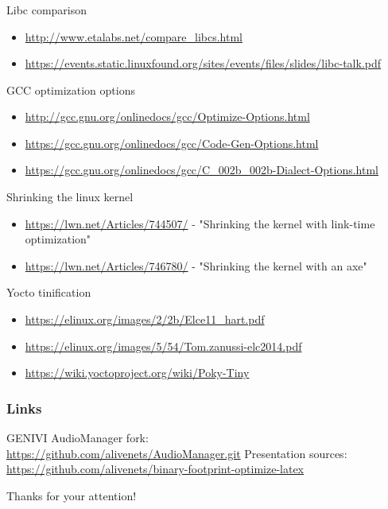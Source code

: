 \documentclass[usenames,dvipsnames]{beamer}
\begin{document}
\begin{frame}
\frametitle{\secname}
\tiny

Libc comparison

\begin{itemize}
	\item \url{http://www.etalabs.net/compare_libcs.html}
	\item \url{https://events.static.linuxfound.org/sites/events/files/slides/libc-talk.pdf}
\end{itemize}

GCC optimization options

\begin{itemize}
	\item \url{http://gcc.gnu.org/onlinedocs/gcc/Optimize-Options.html}
	\item \url{https://gcc.gnu.org/onlinedocs/gcc/Code-Gen-Options.html}
	\item \url{https://gcc.gnu.org/onlinedocs/gcc/C_002b_002b-Dialect-Options.html}
\end{itemize}

Shrinking the linux kernel

\begin{itemize}
	\item \url{https://lwn.net/Articles/744507/} - "Shrinking the kernel with link-time optimization"
	\item \url{https://lwn.net/Articles/746780/} - "Shrinking the kernel with an axe"
\end{itemize}

Yocto tinification

\begin{itemize}
	\item \url{https://elinux.org/images/2/2b/Elce11_hart.pdf}
	\item \url{https://elinux.org/images/5/54/Tom.zanussi-elc2014.pdf}
	\item \url{https://wiki.yoctoproject.org/wiki/Poky-Tiny}
\end{itemize}
\end{frame}

\begin{frame}
\frametitle{Links}
\footnotesize
GENIVI AudioManager fork: \\ \url{https://github.com/alivenets/AudioManager.git}
\newline \newline
Presentation sources: \\ \url{https://github.com/alivenets/binary-footprint-optimize-latex}
\end{frame}

\begin{frame}{}
\center \Huge Thanks for your attention!
\end{frame}
\end{document}
